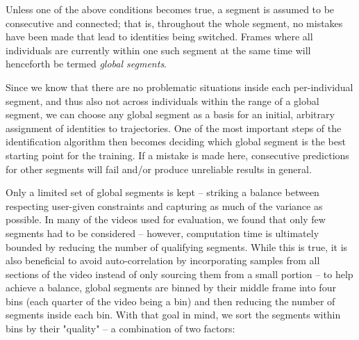 \documentclass[9pt,lineno]{elife}
\begin{document}
Unless one of the above conditions becomes true, a segment is assumed to be consecutive and connected; that is, throughout the whole segment, no mistakes have been made that lead to identities being switched. Frames where all individuals are currently within one such segment at the same time will henceforth be termed \emph{global segments}.

Since we know that there are no problematic situations inside each per-individual segment, and thus also not across individuals within the range of a global segment, we can choose any global segment as a basis for an initial, arbitrary assignment of identities to trajectories. One of the most important steps of the identification algorithm then becomes deciding which global segment is the best starting point for the training. If a mistake is made here, consecutive predictions for other segments will fail and/or produce unreliable results in general. %


Only a limited set of global segments is kept -- striking a balance between respecting user-given constraints and capturing as much of the variance as possible. In many of the videos used for evaluation, we found that only few segments had to be considered -- however, computation time is ultimately bounded by reducing the number of qualifying segments. While this is true, it is also beneficial to avoid auto-correlation by incorporating samples from all sections of the video instead of only sourcing them from a small portion -- to help achieve a balance, global segments are binned by their middle frame into four bins (each quarter of the video being a bin) and then reducing the number of segments inside each bin. With that goal in mind, we sort the segments within bins by their "quality" -- a combination of two factors:
\end{document}
